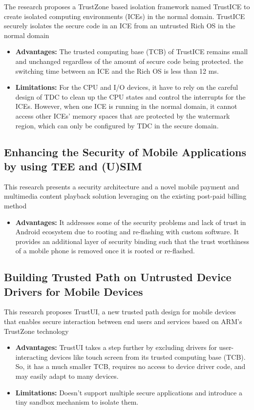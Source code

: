 \documentclass[conference]{IEEEtran}
\begin{document}
\cite{mobile1} The research proposes a TrustZone based isolation framework named TrustICE to create isolated computing environments (ICEs) in the normal domain. TrustICE securely isolates the secure code in an ICE from an untrusted Rich OS in the normal domain
\begin{itemize}
    \item \textbf{Advantages:} The trusted computing base (TCB) of TrustICE remains small and unchanged regardless of the amount of secure code being protected. the switching time between an ICE and the Rich OS is less than 12 ms.
    \item \textbf{Limitations:} For the CPU and I/O devices, it have to rely on the careful design of TDC to clean up the CPU states and control the interrupts for the ICEs. However, when one ICE is running in the normal domain, it cannot access other ICEs’ memory spaces that are protected by the watermark region, which can only be configured by TDC in the secure domain.
\end{itemize}


\subsection{Enhancing the Security of Mobile Applications by using TEE and (U)SIM}
\cite{mobile2} This research presents a security architecture and a novel mobile payment and multimedia content playback solution leveraging on the existing post-paid billing method
\begin{itemize}
    \item \textbf{Advantages:} It addresses some of the security problems and lack of trust in Android ecosystem due to rooting and re-flashing with custom software. It provides an additional layer of security binding such that the trust worthiness of a mobile phone is removed once it is rooted or re-flashed.
\end{itemize}


\subsection{Building Trusted Path on Untrusted Device Drivers for Mobile Devices}
\cite{mobile3} This research proposes TrustUI, a new trusted path design for mobile devices that enables secure interaction between end users and services based on ARM’s TrustZone technology
\begin{itemize}
    \item \textbf{Advantages:} TrustUI takes a step further by excluding drivers for user-interacting devices like touch screen from its trusted computing base (TCB). So, it has a much smaller TCB, requires no access to device driver code, and may easily adapt to many devices.
    \item \textbf{Limitations:} Doesn't support multiple secure applications and introduce a tiny sandbox mechanism to isolate them.
\end{itemize}
\end{document}
